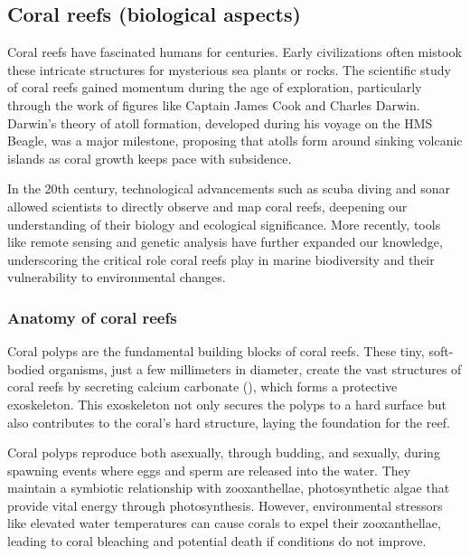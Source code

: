 \subsection{Coral reefs (biological aspects)}
\label{sec:state-of-the-art_biology}

Coral reefs have fascinated humans for centuries. Early civilizations often mistook these intricate structures for mysterious sea plants or rocks. The scientific study of coral reefs gained momentum during the age of exploration, particularly through the work of figures like Captain James Cook and Charles Darwin. Darwin's theory of atoll formation, developed during his voyage on the HMS Beagle, was a major milestone, proposing that atolls form around sinking volcanic islands as coral growth keeps pace with subsidence.

In the 20th century, technological advancements such as scuba diving and sonar allowed scientists to directly observe and map coral reefs, deepening our understanding of their biology and ecological significance. More recently, tools like remote sensing and genetic analysis have further expanded our knowledge, underscoring the critical role coral reefs play in marine biodiversity and their vulnerability to environmental changes.

\subsubsection{Anatomy of coral reefs}


Coral polyps are the fundamental building blocks of coral reefs. These tiny, soft-bodied organisms, just a few millimeters in diameter, create the vast structures of coral reefs by secreting calcium carbonate (), which forms a protective exoskeleton. This exoskeleton not only secures the polyps to a hard surface but also contributes to the coral's hard structure, laying the foundation for the reef.

Coral polyps reproduce both asexually, through budding, and sexually, during spawning events where eggs and sperm are released into the water. They maintain a symbiotic relationship with zooxanthellae, photosynthetic algae that provide vital energy through photosynthesis. However, environmental stressors like elevated water temperatures can cause corals to expel their zooxanthellae, leading to coral bleaching and potential death if conditions do not improve.


